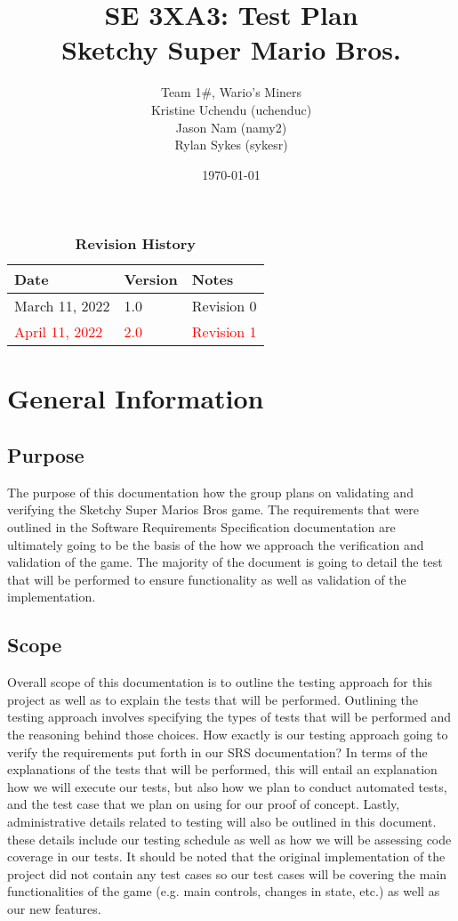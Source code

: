 \documentclass[12pt, titlepage]{article}
\title{SE 3XA3: Test Plan\\Sketchy Super Mario Bros.}
\author{Team 1\#, Wario's Miners
		\\ Kristine Uchendu (uchenduc)
		\\ Jason Nam (namy2)
		\\ Rylan Sykes (sykesr)
}
\date{\today}
\begin{document}
\maketitle

\tableofcontents
\listoftables
\listoffigures

\begin{table}[bp]
\caption{\bf Revision History}
\begin{tabularx}{\textwidth}{p{3cm}p{2cm}X}
\toprule {\bf Date} & {\bf Version} & {\bf Notes}\\
\midrule
March 11, 2022 & 1.0 & Revision 0\\
\textcolor{red}{April 11, 2022} & \textcolor{red}{2.0} & \textcolor{red}{Revision 1}\\
\bottomrule
\end{tabularx}
\end{table}

\newpage


\section{General Information}

\subsection{Purpose}

The purpose of this documentation how the group plans on validating and verifying the Sketchy Super Marios Bros game. The requirements that were outlined in the Software Requirements Specification documentation are ultimately going to be the basis of the how we approach the verification and validation of the game. The majority of the document is going to detail the test that will be performed to ensure functionality as well as validation of the implementation.

\subsection{Scope}

Overall scope of this documentation is to outline the testing approach for this project as well as to explain the tests that will be performed. Outlining the testing approach involves specifying the types of tests that will be performed and the reasoning behind those choices. How exactly is our testing approach going to verify the requirements put forth in our SRS documentation? In terms of the explanations of the tests that will be performed, this will entail an explanation how we will execute our tests, but also how we plan to conduct automated tests, and the test case that we plan on using for our proof of concept. Lastly, administrative details related to testing will also be outlined in this document. these details include our testing schedule as well as how we will be assessing code coverage in our tests. It should be noted that the original implementation of the project did not contain any test cases so our test cases will be covering the main functionalities of the game (e.g. main controls, changes in state, etc.) as well as our new features.
\end{document}
